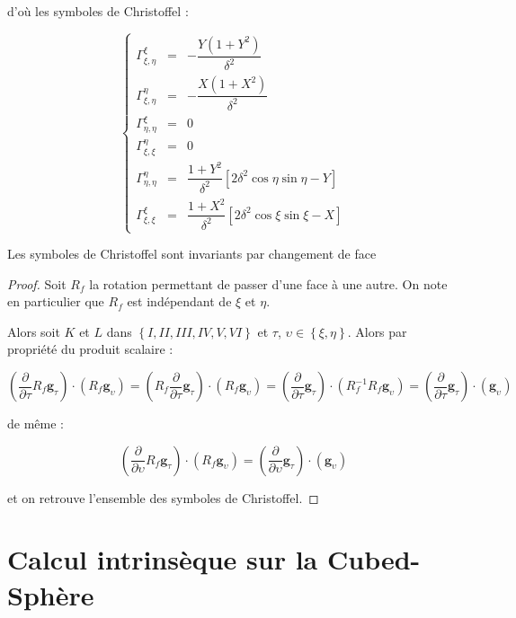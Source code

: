 d'où les symboles de Christoffel :

\begin{equation}
\left\lbrace
\begin{array}{rcl}
\Gamma_{\xi,\eta}^{\xi} & = & - \dfrac{Y ( 1+Y^2)}{\delta^2}\\
\Gamma_{\xi,\eta}^{\eta} & = & - \dfrac{X(1+X^2)}{\delta^2}\\
\Gamma_{\eta,\eta}^{\xi} & = & 0 \\
\Gamma_{\xi,\xi}^{\eta} & = & 0 \\
\Gamma_{\eta,\eta}^{\eta} & = & \dfrac{1+Y^2}{\delta^2} \left[ 2 \delta^2 \cos \eta \sin \eta - Y \right]\\
\Gamma_{\xi,\xi}^{\xi} & = & \dfrac{1+X^2}{\delta^2} \left[ 2 \delta^2 \cos \xi \sin \xi - X \right]
\end{array}
\right.
\end{equation}

\begin{proposition}
Les symboles de Christoffel sont invariants par changement de face
\end{proposition}

\begin{proof}
Soit $R_f$ la rotation permettant de passer d'une face à une autre. On note en particulier que $R_f$ est indépendant de $\xi$ et $\eta$.

Alors soit $K$ et $L$ dans $\left\lbrace I, II, III, IV, V, VI \right\rbrace$ et $\tau$, $\upsilon \in \left\lbrace \xi, \eta \right\rbrace$. Alors par propriété du produit scalaire :

$$\left( \dfrac{\partial}{\partial \tau}  R_f \mathbf{g}_{\tau} \right) \cdot \left( R_f \mathbf{g}_{\upsilon} \right) = \left( R_f \dfrac{\partial}{\partial \tau}   \mathbf{g}_{\tau} \right) \cdot \left( R_f \mathbf{g}_{\upsilon} \right) =  \left( \dfrac{\partial}{\partial \tau}  \mathbf{g}_{\tau} \right) \cdot \left( R_f^{-1} R_f \mathbf{g}_{\upsilon} \right) =  \left( \dfrac{\partial}{\partial \tau}  \mathbf{g}_{\tau} \right) \cdot \left( \mathbf{g}_{\upsilon} \right)$$

de même :

$$\left( \dfrac{\partial}{\partial \upsilon}  R_f \mathbf{g}_{\tau} \right) \cdot \left( R_f \mathbf{g}_{\upsilon} \right) =  \left( \dfrac{\partial}{\partial \upsilon} \mathbf{g}_{\tau} \right) \cdot \left( \mathbf{g}_{\upsilon} \right)$$

et on retrouve l'ensemble des symboles de Christoffel.
\end{proof}










\section{Calcul intrinsèque sur la Cubed-Sphère}


















